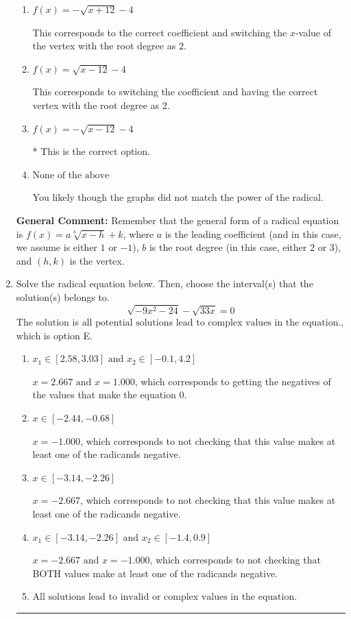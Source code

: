 \documentclass{extbook}[14pt]
\newcommand{\litem}[1]{\item #1

\rule{\textwidth}{0.4pt}}
\begin{document}
\begin{enumerate}
{\begin{enumerate}[label=\Alph*.]
This corresponds to switching the coefficient AND switching the $x$-value of the vertex with the root degree as $2$.
\item \( f(x) = - \sqrt{x + 12} - 4 \)

This corresponds to the correct coefficient and switching the $x$-value of the vertex with the root degree as $2$.
\item \( f(x) = \sqrt{x - 12} - 4 \)

This corresponds to switching the coefficient and having the correct vertex with the root degree as $2$.
\item \( f(x) = - \sqrt{x - 12} - 4 \)

* This is the correct option.
\item \( \text{None of the above} \)

You likely though the graphs did not match the power of the radical.
\end{enumerate}

\textbf{General Comment:} Remember that the general form of a radical equation is $ f(x) = a \sqrt[b]{x - h} + k$, where $a$ is the leading coefficient (and in this case, we assume is either $1$ or $-1$), $b$ is the root degree (in this case, either $2$ or $3$), and $(h, k)$ is the vertex.
}
\litem{
Solve the radical equation below. Then, choose the interval(s) that the solution(s) belongs to.
\[ \sqrt{-9 x^2 - 24} - \sqrt{33 x} = 0 \]The solution is \( \text{all potential solutions lead to complex values in the equation.} \), which is option E.\begin{enumerate}[label=\Alph*.]
\item \( x_1 \in [2.58, 3.03] \text{ and } x_2 \in [-0.1,4.2] \)

$x = 2.667 \text{ and } x = 1.000$, which corresponds to getting the negatives of the values that make the equation 0.
\item \( x \in [-2.44,-0.68] \)

$x = -1.000$, which corresponds to not checking that this value makes at least one of the radicands negative.
\item \( x \in [-3.14,-2.26] \)

$x = -2.667$, which corresponds to not checking that this value makes at least one of the radicands negative.
\item \( x_1 \in [-3.14, -2.26] \text{ and } x_2 \in [-1.4,0.9] \)

$x = -2.667 \text{ and } x = -1.000$, which corresponds to not checking that BOTH values make at least one of the radicands negative.
\item \( \text{All solutions lead to invalid or complex values in the equation.} \)


\end{enumerate}}
\end{enumerate}
\end{document}
